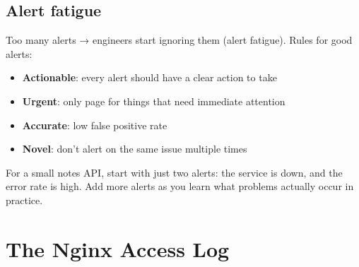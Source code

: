 \begin{codebox}
\begin{Shaded}
\begin{Highlighting}[]
\AttributeTok{      }\KeywordTok{{-}}\AttributeTok{ }\KeywordTok{:}
\AttributeTok{        }\KeywordTok{:}
\AttributeTok{        }\KeywordTok{:}
\AttributeTok{        }\KeywordTok{:}
\AttributeTok{          }\KeywordTok{:}
\AttributeTok{        }\KeywordTok{:}
\AttributeTok{          }\KeywordTok{:}\AttributeTok{ }
\end{Highlighting}
\end{Shaded}

\end{codebox}

\subsection*{Alert fatigue}\label{35-observability:alert-fatigue}

Too many alerts → engineers start ignoring them (alert fatigue). Rules for good alerts:

\begin{itemize}
\tightlist
\item
  \textbf{Actionable}: every alert should have a clear action to take
\item
  \textbf{Urgent}: only page for things that need immediate attention
\item
  \textbf{Accurate}: low false positive rate
\item
  \textbf{Novel}: don't alert on the same issue multiple times
\end{itemize}

\noindent{}For a small notes API, start with just two alerts: the service is down, and the error rate is high. Add more alerts as you learn what problems actually occur in practice.

\setcounter{section}{6}
\section{The Nginx Access Log}\label{35-observability:357-the-nginx-access-log}

